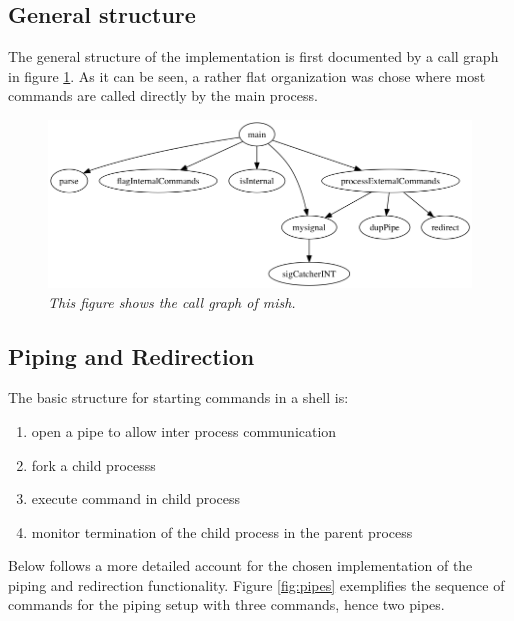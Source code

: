 \documentclass[a4paper,11pt,twoside]{article}
\begin{document}
\subsection{General structure}
The general structure of the implementation is first documented by a call graph in figure \ref{fig:callgraph}. As it can be seen, a rather flat organization was chose where most commands are called directly by the main process.
\begin{figure}
\centering
\includegraphics[width=\textwidth]{callgraph.png}
\caption{\textit{This figure shows the call graph of mish.}}
\label{fig:callgraph}
\end{figure}


\subsection{Piping and Redirection}

The basic structure for starting commands in a shell is:
\begin{enumerate}
\item open a pipe to allow inter process communication
\item fork a child processs
\item execute command in child process
\item monitor termination of the child process in the parent process
\end{enumerate}

Below follows a more detailed account for the chosen implementation of the piping and redirection functionality. Figure \ref{fig:pipes} exemplifies the sequence of commands for the piping setup with three commands, hence two pipes. 
\end{document}
